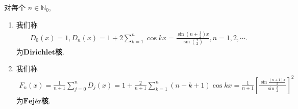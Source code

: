\documentclass[../../main.tex]{subfiles}%
\begin{document}
\begin{definition}
对每个 $n \in \mathbb{N}_0$,
\begin{enumerate}
\item 我们称
\begin{gather}\label{eq:--------::24--18.25}
D_0(x) = 1, D_n(x) = 1 + 2\sum_{k = 1}^{n} \cos kx = \frac{\sin\left(n + \frac{1}{2}\right)x}{\sin\left(\frac{x}{2}\right)}, n = 1, 2, \cdots. 
\end{gather}
为$\mathbf{Dirichlet}$\textbf{核}.

\item 我们称
\begin{align}
F_n(x) = \frac{1}{n + 1}\sum_{j = 0}^{n} D_j(x) = 1 + \frac{2}{n + 1}\sum_{k = 1}^{n} (n - k + 1)\cos kx = \frac{1}{n + 1} \left[ \frac{\sin\frac{(n + 1)x}{2}}{\sin\frac{x}{2}} \right]^2 \label{eq::;23428798797--18.26}
\end{align}
为$\mathbf{Fejér}$\textbf{核}.
\end{enumerate}
\end{definition}
\end{document}

